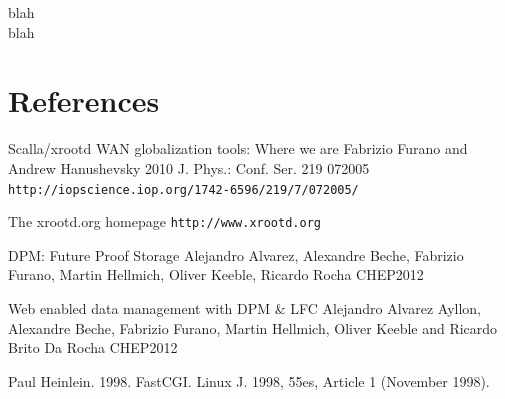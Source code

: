 \documentclass[a4paper]{jpconf}
\begin{document}
blah\\
blah\\

\section*{References}
\begin{thebibliography}{9}

 Scalla/xrootd WAN globalization tools: Where we are
Fabrizio Furano and Andrew Hanushevsky 2010 J. Phys.: Conf. Ser. 219 072005
\verb"http://iopscience.iop.org/1742-6596/219/7/072005/"

 The xrootd.org homepage
\verb"http://www.xrootd.org"

 DPM: Future Proof Storage
Alejandro Alvarez, Alexandre Beche, Fabrizio Furano, Martin Hellmich, Oliver Keeble, Ricardo Rocha
CHEP2012

 Web enabled data management with DPM \& LFC
Alejandro Alvarez Ayllon, Alexandre Beche, Fabrizio Furano, Martin Hellmich, Oliver Keeble and Ricardo Brito Da Rocha
CHEP2012

 Paul Heinlein. 1998. FastCGI. Linux J. 1998, 55es, Article 1 (November 1998).

\end{thebibliography}
\end{document}
